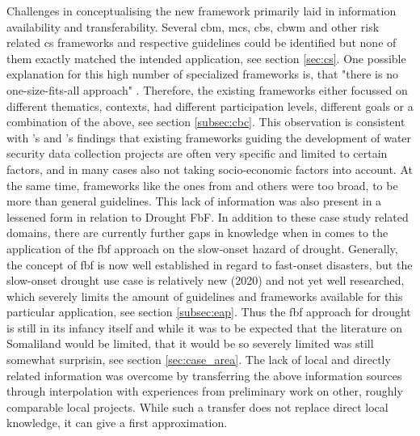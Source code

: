 Challenges in conceptualising the new framework primarily laid in information availability and transferability. Several \acrshort{cbm}, \acrshort{mcs}, \acrshort{cbs}, \acrshort{cbwm} and other risk related \acrshort{cs} frameworks and respective guidelines could be identified but none of them exactly matched the intended application, see section \ref{sec:cs}. One possible explanation for this high number of specialized frameworks is, that "there is no one-size-fits-all approach" \autocite[2]{fraislCitizenScienceEnvironmental2022}. Therefore, the existing frameworks either focussed on different thematics, contexts, had different participation levels, different goals or a combination of the above, see section \ref{subsec:cbc}. This observation is consistent with \citeauthor{butteFrameworkWaterSecurity2022}'s \citeyear{butteFrameworkWaterSecurity2022} and \citeauthor{carrionCrowdsourcingWaterQuality2020}'s \citeyear{carrionCrowdsourcingWaterQuality2020} findings that existing frameworks guiding the development of water security data collection projects are often very specific and limited to certain factors, and in many cases also not taking socio-economic factors into account. At the same time, frameworks like the ones from \textcite{butteFrameworkWaterSecurity2022,eu-citizen.scienceEUCitizenScience,citizenscience.govBasicStepsYour} and others were too broad, to be more than general guidelines.\newline
This lack of information was also present in a lessened form in relation to Drought FbF. In addition to these case study related domains, there are currently further gaps in knowledge when in comes to the application of the \acrshort{fbf} approach on the slow-onset hazard of drought. Generally, the concept of \acrshort{fbf} is now well established in regard to fast-onset disasters, but the slow-onset drought use case is relatively new (2020) and not yet well researched, which severely limits the amount of guidelines and frameworks available for this particular application, see section \ref{subsec:eap}. Thus the \acrshort{fbf} approach for drought is still in its infancy itself and while it was to be expected that the literature on Somaliland would be limited, that it would be so severely limited was still somewhat surprisin, see section \ref{sec:case_area}. The lack of local and directly related information was overcome by transferring the above information sources through interpolation with experiences from preliminary work on other, roughly comparable local projects. While such a transfer does not replace direct local knowledge, it can give a first approximation.\newline
